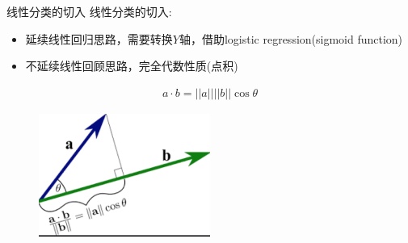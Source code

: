 \documentclass[handout]{ctexbeamer}
\begin{document}
\begin{frame}{线性分类的切入}
	线性分类的切入:
	\begin{itemize}
	\setlength\itemsep{0.6em}
		\item 延续线性回归思路，需要转换$Y$轴，借助logistic regression(sigmoid function) 
		\item 不延续线性回顾思路，完全代数性质(点积)
	\end{itemize}
	\begin{align*}
		a \cdot b = ||a|| ||b|| \cos \theta
	\end{align*}
	\begin{figure}[H]
		\centering
		\includegraphics[width=0.5\textwidth]{fig/C2C2svmprojc}
	\end{figure}
\end{frame}
\end{document}
